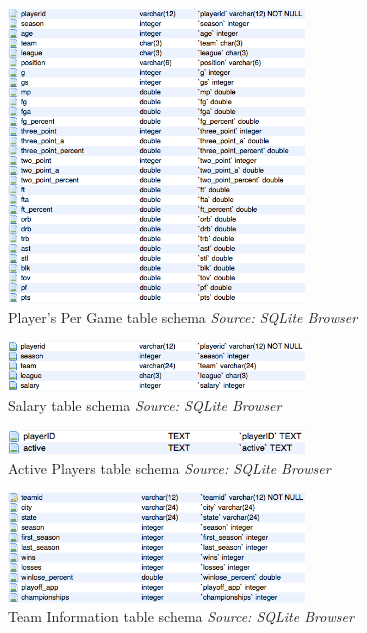 \begin{figure}[h!]
	\begin{center}
		\includegraphics[width=0.7\textwidth]{./images/player_per_game}
		\caption{Player's Per Game table schema \textit{Source: SQLite Browser}}
		\label{fig:411-3}
	\end{center}
\end{figure}

\begin{figure}[h!]
	\begin{center}
		\includegraphics[width=0.7\textwidth]{./images/salary}
		\caption{Salary table schema \textit{Source: SQLite Browser}}
		\label{fig:411-4}
	\end{center}
\end{figure}

\begin{figure}[h!]
	\begin{center}
		\includegraphics[width=0.7\textwidth]{./images/activeplayers}
		\caption{Active Players table schema \textit{Source: SQLite Browser}}
		\label{fig:411-5}
	\end{center}
\end{figure}

\begin{figure}[h!]
	\begin{center}
		\includegraphics[width=0.7\textwidth]{./images/teaminfo}
		\caption{Team Information table schema \textit{Source: SQLite Browser}}
		\label{fig:411-6}
	\end{center}
\end{figure}

